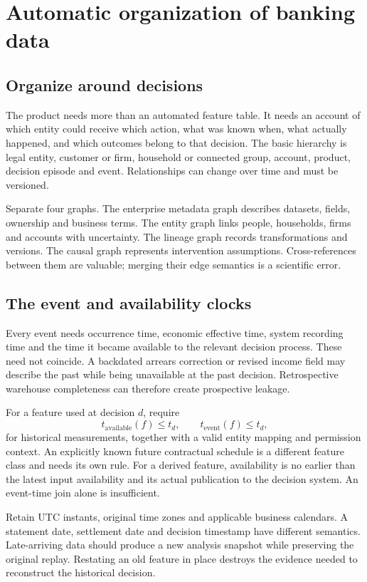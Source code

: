 \chapter{Automatic organization of banking data}\label{ch:data}
\section{Organize around decisions}
The product needs more than an automated feature table. It needs an account
of which entity could receive which action, what was known when, what
actually happened, and which outcomes belong to that decision.
The basic hierarchy is legal entity, customer or firm, household or connected
group, account, product, decision episode and event. Relationships can change
over time and must be versioned.

Separate four graphs. The enterprise metadata graph describes datasets,
fields, ownership and business terms. The entity graph links people,
households, firms and accounts with uncertainty. The lineage graph records
transformations and versions. The causal graph represents intervention
assumptions. Cross-references between them are valuable; merging their edge
semantics is a scientific error.

\section{The event and availability clocks}
Every event needs occurrence time, economic effective time, system recording
time and the time it became available to the relevant decision process.
These need not coincide. A backdated arrears correction or revised income
field may describe the past while being unavailable at the past decision.
Retrospective warehouse completeness can therefore create prospective leakage.

For a feature used at decision $d$, require
\begin{equation}
 t_{\mathrm{available}}(f)\leq t_d,\qquad
 t_{\mathrm{event}}(f)\leq t_d,
 \label{eq:availability}
\end{equation}
for historical measurements, together with a valid entity mapping and
permission context. An explicitly known future contractual schedule is a
different feature class and needs its own rule. For a derived feature,
availability is no earlier than the latest input availability and its actual
publication to the decision system. An event-time join alone is insufficient.

Retain UTC instants, original time zones and applicable business calendars.
A statement date, settlement date and decision timestamp have different
semantics. Late-arriving data should produce a new analysis snapshot while
preserving the original replay. Restating an old feature in place destroys
the evidence needed to reconstruct the historical decision.

